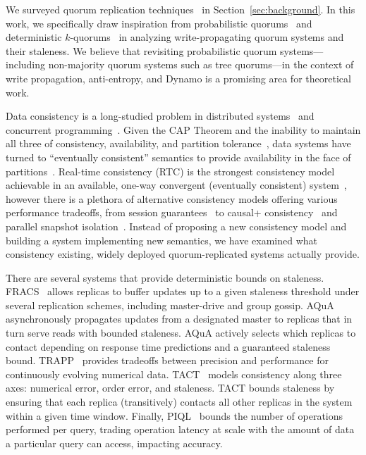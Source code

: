 \documentclass{vldb}
\begin{document}
We surveyed quorum replication
techniques~\cite{prob-quorum-dynamic, 92-quorums, treequorum, non-strict,
  multi-k-quorum, quorums-start, quorum-placement, partitionedquorum, quorums-alternative, prob-quorum,
  quorum-overview, quorumsystems} in Section~\ref{sec:background}.  In
this work, we specifically draw inspiration from probabilistic
quorums~\cite{prob-quorum} and deterministic
$k$-quorums~\cite{ non-strict, multi-k-quorum} in analyzing
write-propagating quorum systems and their staleness.  We believe that
revisiting probabilistic quorum systems---including non-majority
quorum systems such as tree quorums---in the context of write
propagation, anti-entropy, and Dynamo is a promising area for theoretical
work.

Data consistency is a long-studied problem in distributed
systems~\cite{consistency-partitioned, danger-rep} and concurrent
programming~\cite{linearizability}.  Given the CAP Theorem and the
inability to maintain all three of consistency, availability, and
partition tolerance~\cite{cap-proof}, data systems have turned to
``eventually consistent'' semantics to provide availability in the
face of partitions~\cite{consistency-partitioning, vogels-defs}.
Real-time consistency (RTC) is the strongest consistency model
achievable in an available, one-way convergent (eventually consistent)
system~\cite{rtc-proof}, however there is a plethora of alternative
consistency models offering various performance tradeoffs, from
session guarantees~\cite{sessionguarantees} to causal+
consistency~\cite{cops} and parallel snapshot isolation~\cite{walter}.
Instead of proposing a new consistency model and building a system
implementing new semantics, we have examined what consistency
existing, widely deployed quorum-replicated systems actually provide.

There are several systems that provide deterministic bounds on
staleness.  FRACS~\cite{frac} allows replicas to buffer updates up to
a given staleness threshold under several replication schemes,
including master-drive and group gossip.  AQuA~\cite{aqua}
asynchronously propagates updates from a designated master to replicas
that in turn serve reads with bounded staleness.  AQuA actively
selects which replicas to contact depending on response time
predictions and a guaranteed staleness bound.  TRAPP~\cite{trapp}
provides tradeoffs between precision and performance for continuously
evolving numerical data.  TACT~\cite{vahdat-article, vahdat-bounded}
models consistency along three axes: numerical error, order error, and
staleness.  TACT bounds staleness by ensuring that each replica
(transitively) contacts all other replicas in the system within a
given time window.  Finally, PIQL~\cite{piql} bounds the number of
operations performed per query, trading operation latency at scale
with the amount of data a particular query can access, impacting
accuracy.
\end{document}
